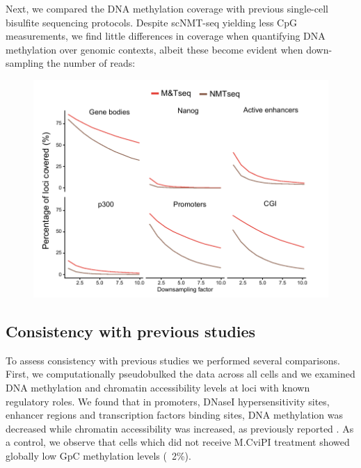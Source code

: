 Next, we compared the DNA methylation coverage with previous single-cell bisulfite sequencing protocols\cite{Angermueller2016}. Despite scNMT-seq yielding less CpG measurements, we find little differences in coverage when quantifying DNA methylation over genomic contexts, albeit these become evident when down-sampling the number of reads:

\begin{figure}[H]
	\centering
	\includegraphics[width=0.8\linewidth]{scNMT_coverage2}
	\caption[]{}
	\label{fig:scnmt_coverage2}
\end{figure}




\subsection{Consistency with previous studies}

To assess consistency with previous studies we performed several comparisons.\\

First, we computationally pseudobulked the data across all cells and we examined DNA methylation and chromatin accessibility levels at loci with known regulatory roles. We found that in promoters, DNaseI hypersensitivity sites, enhancer regions and transcription factors binding sites, DNA methylation was decreased while chromatin accessibility was increased, as previously reported \cite{Pott2016}. As a control, we observe that cells which did not receive M.CviPI treatment showed globally low GpC methylation levels (~2\%).

